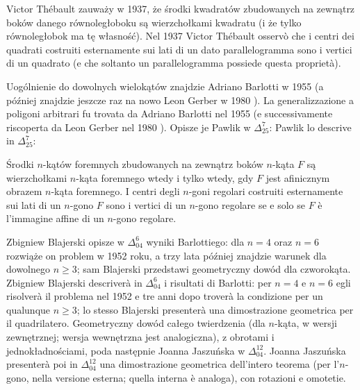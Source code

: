 Victor Thébault zauważy w 1937, że środki kwadratów zbudowanych na zewnątrz boków danego równoległoboku są wierzchołkami kwadratu (i że tylko równoległobok ma tę własność). %
Nel 1937 Victor Thébault osservò che i centri dei quadrati costruiti esternamente sui lati di un dato parallelogramma sono i vertici di un quadrato (e che soltanto un parallelogramma possiede questa proprietà). %
%

Uogólnienie do dowolnych wielokątów znajdzie Adriano Barlotti w 1955 (a później znajdzie jeszcze raz na nowo Leon Gerber w 1980 \cite{gerber_1980}). %
La generalizzazione a poligoni arbitrari fu trovata da Adriano Barlotti nel 1955 (e successivamente riscoperta da Leon Gerber nel 1980 \cite{gerber_1980}). %
%
%
Opisze je Pawlik w $\Delta_{25}^7$: %
Pawlik lo descrive in $\Delta_{25}^7$: %

\begin{proposition}
    Środki $n$-kątów foremnych zbudowanych na zewnątrz boków $n$-kąta $F$ są wierzchołkami $n$-kąta foremnego wtedy i tylko wtedy, gdy $F$ jest afinicznym obrazem $n$-kąta foremnego. %
    I centri degli $n$-goni regolari costruiti esternamente sui lati di un $n$-gono $F$ sono i vertici di un $n$-gono regolare se e solo se $F$ è l'immagine affine di un $n$-gono regolare. %
\end{proposition}

Zbigniew Blajerski opisze w $\Delta_{04}^6$ wyniki Barlottiego: dla $n = 4$ oraz $n = 6$ rozwiąże on problem w 1952 roku, a trzy lata później znajdzie warunek dla dowolnego $n \ge 3$; sam Blajerski przedstawi geometryczny dowód dla czworokąta. %
Zbigniew Blajerski descriverà in $\Delta_{04}^6$ i risultati di Barlotti: per $n = 4$ e $n = 6$ egli risolverà il problema nel 1952 e tre anni dopo troverà la condizione per un qualunque $n \ge 3$; lo stesso Blajerski presenterà una dimostrazione geometrica per il quadrilatero. %
Geometryczny dowód całego twierdzenia (dla $n$-kąta, w wersji zewnętrznej; wersja wewnętrzna jest analogiczna), z obrotami i jednokładnościami, poda następnie Joanna Jaszuńska w $\Delta_{04}^{12}$. %
Joanna Jaszuńska presenterà poi in $\Delta_{04}^{12}$ una dimostrazione geometrica dell'intero teorema (per l'$n$-gono, nella versione esterna; quella interna è analoga), con rotazioni e omotetie. %

%